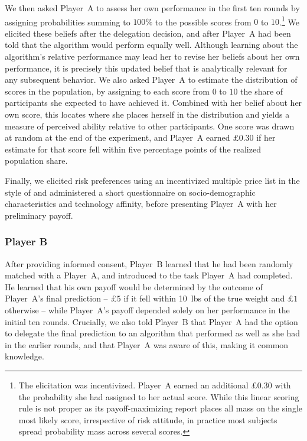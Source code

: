 We then asked Player~A to assess her own performance in the first ten rounds by assigning probabilities summing to $100\%$ to the possible scores from $0$ to $10$.\footnote{The elicitation was incentivized. Player~A earned an additional $\pounds 0.30$ with the probability she had assigned to her actual score. While this linear scoring rule is not proper as its payoff-maximizing report places all mass on the single most likely score, irrespective of risk attitude, in practice most subjects spread probability mass across several scores.} We elicited these beliefs after the delegation decision, and after Player~A had been told that the algorithm would perform equally well. Although learning about the algorithm's relative performance may lead her to revise her beliefs about her own performance, it is precisely this updated belief that is analytically relevant for any subsequent behavior.  We also asked Player~A to estimate the distribution of scores in the population, by assigning to each score from $0$ to $10$ the share of participants she expected to have achieved it. Combined with her belief about her own score, this locates where she places herself in the distribution and yields a measure of perceived ability relative to other participants. One score was drawn at random at the end of the experiment, and Player~A earned $\pounds 0.30$ if her estimate for that score fell within five percentage points of the realized population share.

Finally, we elicited risk preferences using an incentivized multiple price list in the style of \citet{holt_risk_2002} and administered a short questionnaire on socio-demographic characteristics and technology affinity, before presenting Player~A with her preliminary payoff.

\subsubsection*{Player B}

After providing informed consent, Player~B learned that he had been randomly matched with a Player~A, and introduced to the task Player~A had completed. He learned that his own payoff would be determined by the outcome of Player~A's final prediction -- $\pounds 5$ if it fell within 10~lbs of the true weight and $\pounds 1$ otherwise -- while Player~A's payoff depended solely on her performance in the initial ten rounds. Crucially, we also told Player~B that Player~A had the option to delegate the final prediction to an algorithm that performed as well as she had in the earlier rounds, and that Player~A was aware of this, making it common knowledge.

